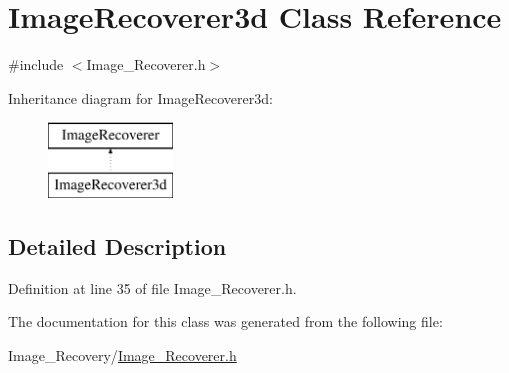 \hypertarget{class_image_recoverer3d}{}\section{Image\+Recoverer3d Class Reference}
\label{class_image_recoverer3d}


{\ttfamily \#include $<$Image\+\_\+\+Recoverer.\+h$>$}

Inheritance diagram for Image\+Recoverer3d\+:\begin{figure}[H]
\begin{center}
\leavevmode
\includegraphics[height=2.000000cm]{class_image_recoverer3d}
\end{center}
\end{figure}


\subsection{Detailed Description}


Definition at line 35 of file Image\+\_\+\+Recoverer.\+h.



The documentation for this class was generated from the following file\+:\begin{DoxyCompactItemize}
\item 
Image\+\_\+\+Recovery/\hyperlink{_image___recoverer_8h}{Image\+\_\+\+Recoverer.\+h}\end{DoxyCompactItemize}

